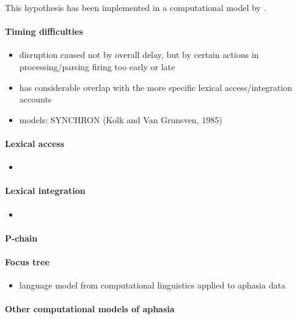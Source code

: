 \documentclass[main_thesis]{subfiles}
\begin{document}
This hypothesis has been implemented in a computational model by .



\paragraph{Timing difficulties}

\begin{itemize}
  \item disruption caused not by overall delay, but by certain actions in processing/parsing firing too early or late
  \item has considerable overlap with the more specific lexical access/integration accounts
  \item models: SYNCHRON (Kolk and Van Grunsven, 1985)
\end{itemize}

\paragraph{Lexical access} 

\begin{itemize}
  \item 
\end{itemize}

\paragraph{Lexical integration}

\begin{itemize}
  \item 
\end{itemize}

\paragraph{P-chain}


\paragraph{Focus tree}

\begin{itemize}
  \item language model from computational linguistics applied to aphasia data \cite{GnjatovicDelic2012}
\end{itemize}

\paragraph{Other computational models of aphasia}
\end{document}
